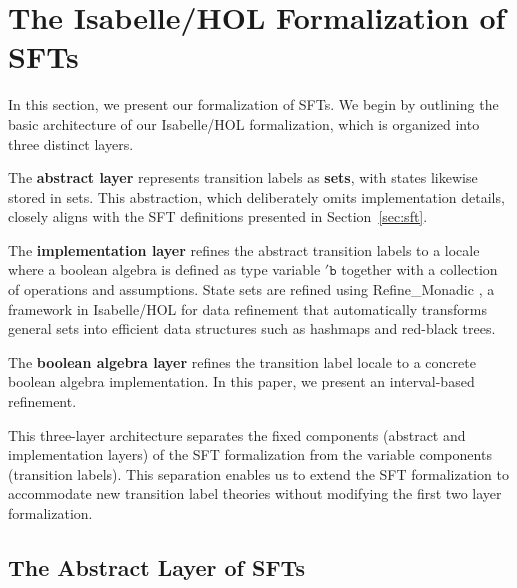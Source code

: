 \section{The Isabelle/HOL Formalization of SFTs}
\label{sec:formalization}


In this section, we present our formalization of SFTs. We begin by outlining the basic architecture of our Isabelle/HOL formalization, which is organized into three distinct layers.

The \textbf{abstract layer} represents transition labels as \textbf{sets}, with states likewise stored in sets. This abstraction, which deliberately omits implementation details, closely aligns with the SFT definitions presented in Section~\ref{sec:sft}.

The \textbf{implementation layer} refines the abstract transition labels to a locale where a boolean algebra is defined as type variable $'\texttt{b}$ together with a collection of operations and assumptions. State sets are refined using Refine\_Monadic \cite{Refine_Monadic-AFP}, a framework in Isabelle/HOL for data refinement that automatically transforms general sets into efficient data structures such as hashmaps and red-black trees.

The \textbf{boolean algebra layer} refines the transition label locale to a concrete boolean algebra implementation. In this paper, we present an interval-based refinement.

This three-layer architecture separates the fixed components (abstract and implementation layers) of the SFT formalization from the variable components (transition labels). This separation enables us to extend the SFT formalization to accommodate new transition label theories without modifying the first two layer formalization.


\subsection{The Abstract Layer of SFTs}
\label{sec:abstract-layer}

